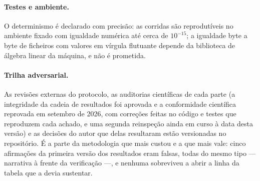 \paragraph{Testes e ambiente.}  
O determinismo é declarado com precisão: as corridas são reprodutíveis no
ambiente fixado com igualdade numérica até cerca de $10^{-15}$; a igualdade
byte a byte de ficheiros com valores em vírgula flutuante depende da
biblioteca de álgebra linear da máquina, e não é prometida.

\paragraph{Trilha adversarial.} As revisões externas do protocolo, as
auditorias científicas de cada parte (a integridade da cadeia de
resultados foi aprovada e a conformidade científica reprovada em setembro
de 2026, com correções feitas no código e testes que reproduzem cada
achado, e uma segunda reinspeção ainda em curso à data desta versão) e as
decisões do autor que delas resultaram estão versionadas no repositório.
É a parte da metodologia que
mais custou e a que mais vale: cinco afirmações da primeira versão dos
resultados eram falsas, todas do mesmo tipo --- narrativa à frente da
verificação ---, e nenhuma sobreviveu a abrir a linha da tabela que a
devia sustentar.

